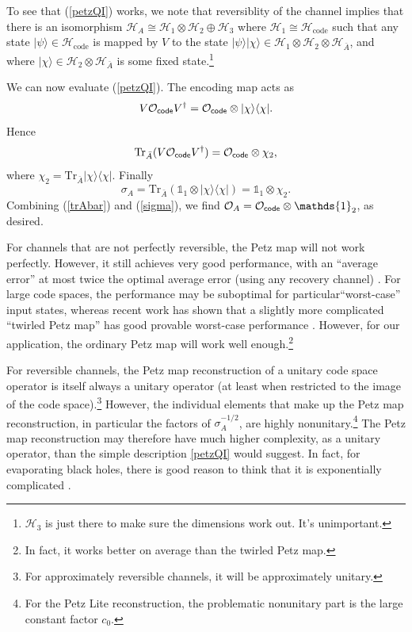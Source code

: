 \documentclass[12pt]{article}
\newcommand{\be}{\begin{equation}}
\newcommand{\ee}{\end{equation}}
\numberwithin{equation}{section}
\def\tr{\text{Tr}}
\begin{document}
To see that (\ref{petzQI}) works, we note that reversiblity of the channel implies that there is an isomorphism $\mathcal{H}_A \cong \mathcal{H}_1 \otimes \mathcal{H}_2 \oplus \mathcal{H}_3$ where $\mathcal{H}_1 \cong \mathcal{H}_\text{code}$ such that any state $|\psi \rangle \in \mathcal{H}_\text{code}$ is mapped by $V$ to the state $|\psi\rangle |\chi\rangle \in \mathcal{H}_1 \otimes \mathcal{H}_2 \otimes \mathcal{H}_{\bar A}$, and where $ |\chi\rangle \in \mathcal{H}_2 \otimes \mathcal{H}_{\bar A}$ is some fixed state.\footnote{$\mathcal{H}_3$ is just there to make sure the dimensions work out. It's unimportant.}

We can now evaluate (\ref{petzQI}). The encoding map acts as
\be
V \mathcal{O}_{\sf code} V^\dagger = \mathcal{O}_{\sf code} \otimes |\chi \rangle\langle \chi|.
\ee
Hence
\be
\text{Tr}_{\bar A} (V \mathcal{O}_{\sf code} V^\dagger) = \mathcal{O}_{\sf code} \otimes \chi_2,\label{trAbar}
\ee
where $\chi_2 = \text{Tr}_{\bar A}  |\chi \rangle\langle \chi|$. Finally
\be
\sigma_A = \tr_{\bar A}(\mathds{1}_1\otimes |\chi\rangle\langle \chi|) = \mathds{1}_1 \otimes \chi_2.\label{sigma}
\ee
Combining (\ref{trAbar}) and (\ref{sigma}), we find $\mathcal{O}_A = \mathcal{O}_{\sf code}\otimes \mathds{1}_2$, as desired.

For channels that are not perfectly reversible, the Petz map will not work perfectly. However, it still achieves very good performance, with an ``average error'' at most twice the optimal average error (using any recovery channel) \cite{barnum2002reversing}. For large code spaces, the performance may be suboptimal for particular``worst-case'' input states, whereas recent work has shown that a slightly more complicated ``twirled Petz map'' has good provable worst-case performance \cite{junge2018universal}. However, for our application, the ordinary Petz map will work well enough.\footnote{In fact, it works better on average than the twirled Petz map.}

For reversible channels, the Petz map reconstruction of a unitary code space operator is itself always a unitary operator (at least when restricted to the image of the code space).\footnote{For approximately reversible channels, it will be approximately unitary.} However, the individual elements that make up the Petz map reconstruction, in particular the factors of $\sigma_A^{-1/2}$, are highly nonunitary.\footnote{For the Petz Lite reconstruction, the problematic nonunitary part is the large constant factor $c_0$.} The Petz map reconstruction may therefore have much higher complexity, as a unitary operator, than the simple description \eqref{petzQI} would suggest. In fact, for evaporating black holes, there is good reason to think that it is exponentially complicated \cite{Harlow:2013tf, PythonsLunch}.
\end{document}
